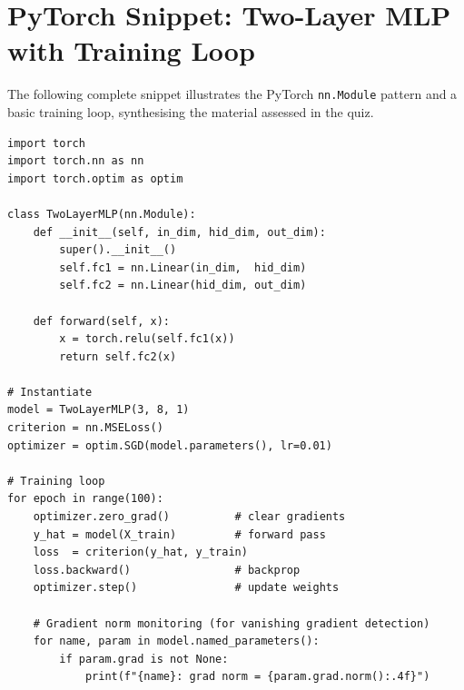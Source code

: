 \documentclass[12pt,a4paper]{article}
\begin{document}
\section{PyTorch Snippet: Two-Layer MLP with Training Loop}
\label{app:pytorch}

The following complete snippet illustrates the PyTorch \texttt{nn.Module}
pattern and a basic training loop, synthesising the material assessed
in the quiz.

\begin{verbatim}
import torch
import torch.nn as nn
import torch.optim as optim

class TwoLayerMLP(nn.Module):
    def __init__(self, in_dim, hid_dim, out_dim):
        super().__init__()
        self.fc1 = nn.Linear(in_dim,  hid_dim)
        self.fc2 = nn.Linear(hid_dim, out_dim)

    def forward(self, x):
        x = torch.relu(self.fc1(x))
        return self.fc2(x)

# Instantiate
model = TwoLayerMLP(3, 8, 1)
criterion = nn.MSELoss()
optimizer = optim.SGD(model.parameters(), lr=0.01)

# Training loop
for epoch in range(100):
    optimizer.zero_grad()          # clear gradients
    y_hat = model(X_train)         # forward pass
    loss  = criterion(y_hat, y_train)
    loss.backward()                # backprop
    optimizer.step()               # update weights

    # Gradient norm monitoring (for vanishing gradient detection)
    for name, param in model.named_parameters():
        if param.grad is not None:
            print(f"{name}: grad norm = {param.grad.norm():.4f}")
\end{verbatim}
\end{document}
